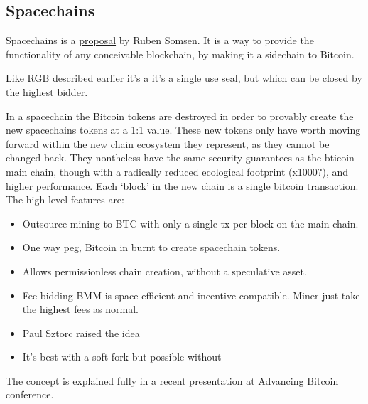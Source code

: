 \subsection{Spacechains}
Spacechains is a \href{https://medium.com/@RubenSomsen/21-million-bitcoins-to-rule-all-sidechains-the-perpetual-one-way-peg-96cb2f8ac302}{proposal} by Ruben Somsen. It is a way to provide the functionality of any conceivable blockchain, by making it a sidechain to Bitcoin. \par
Like RGB described earlier it's a it's a single use seal, but which can be closed by the highest bidder.\par
In a spacechain the Bitcoin tokens are destroyed in order to provably create the new spacechains tokens at a 1:1 value. These new tokens only have worth moving forward within the new chain ecosystem they represent, as they cannot be changed back. They nontheless have the same security guarantees as the bticoin main chain, though with a radically reduced ecological footprint (x1000?), and higher performance. Each `block' in the new chain is a single bitcoin transaction. The high level features are:\par
\begin{itemize}
\item Outsource mining to BTC with only a single tx per block on the main chain.
\item One way peg, Bitcoin in burnt to create spacechain tokens.
\item Allows permissionless chain creation, without a speculative asset.
\item Fee bidding BMM is space efficient and incentive compatible. Miner just take the highest fees as normal.
\item Paul Sztorc raised the idea
\item It's best with a soft fork but possible without
\end{itemize}
The concept is \href{https://vimeo.com/703246895/d89aba6e56}{explained fully} in a recent presentation at Advancing Bitcoin conference.


